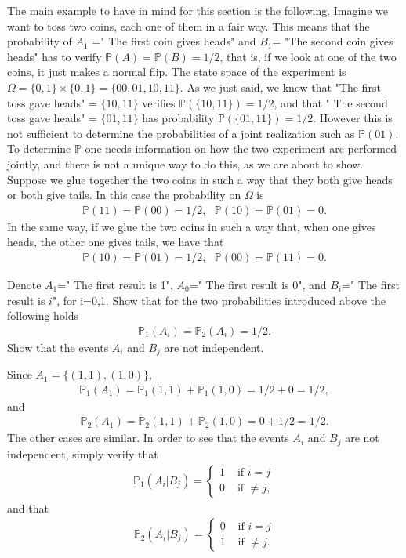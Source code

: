 \documentclass[12pt]{article}
\newcommand{\<}{{\langle \!\! \langle}}
\renewcommand{\>}{{\rangle \!\! \rangle}}
\newcommand{\bel}[2]{\begin{equation} \label{#1} \begin{split} #2
 					\end{split} \end{equation}}
\begin{document}
The main example to have in mind for this section is the following. Imagine we want to toss two coins, each one of them in a fair way. This means that the probability of $A_1$ =" The first coin gives heads" and $B_1$= "The second coin gives heads" has to verify $\mathbb{P}(A)=\mathbb{P}(B) = 1/2$, that is, if we look at one of the two coins, it just makes a normal flip. The state space of the experiment is $\Omega=\{0,1\}\times\{0,1\}=\{00,01,10,11\}$.
As we just said, we know that "The first toss gave heads" = $\{10,11\}$ verifies $\mathbb{P}(\{10,11\}) = 1/2$, and that " The second toss gave heads" = $\{ 01,11\}$ has probability $\mathbb{P}(\{01,11\})=1/2$. However this is not sufficient to determine the probabilities of a joint realization such as $\mathbb{P}(01)$. To determine $\mathbb{P}$ one needs information on how the two experiment are performed jointly, and there is not a unique way to do this, as we are about to show. \\
Suppose we glue together the two coins in such a way that they both give heads or both give tails. In this case the probability on $\Omega$ is 
\bel{}{\mathbb{P}(11)=\mathbb{P}(00)=1/2,\,\,\,\,\mathbb{P}(10)=\mathbb{P}(01)=0.}
In the same way, if we glue the two coins in such a way that, when one gives heads, the other one gives tails, we have that
\bel{}{\mathbb{P}(10)=\mathbb{P}(01)=1/2,\,\,\,\,\mathbb{P}(00)=\mathbb{P}(11)=0.}

\begin{ExerciseList}

\Exercise Denote $A_1$=" The first result is 1", $A_0$=" The first result is 0", and $B_i$=" The first result is $i$", for i=0,1. 
Show that for the two probabilities introduced above the following holds 
    \bel{}{ \mathbb{P}_1(A_i)=\mathbb{P}_2(A_i)=1/2.}
Show that the events $A_i$ and $B_j$ are not independent.

 \Answer Since $A_1=\{(1,1),(1,0)\}$,
\bel{}{\mathbb{P}_1(A_1)=\mathbb{P}_1(1,1)+\mathbb{P}_1(1,0)=1/2+0=1/2,}
and
\bel{}{\mathbb{P}_2(A_1)=\mathbb{P}_2(1,1)+\mathbb{P}_2(1,0)=0+1/2=1/2.}
The other cases are similar.
In order to see that the events $A_i$ and $B_j$ are not independent, simply verify that 
\bel{}{\mathbb{P}_1(A_i|B_j)=\begin{cases} 1 & \textrm{ if } i=j\\
0 & \textrm{ if } \neq j, 
\end{cases}}
and that 
\bel{}{\mathbb{P}_2(A_i|B_j)=\begin{cases} 0 & \textrm{ if } i=j\\
1 & \textrm{ if } \neq j. 
\end{cases}}
\end{ExerciseList}
\end{document}
